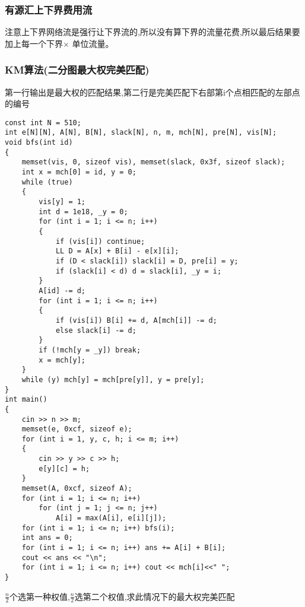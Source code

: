 \documentclass[a4paper, fontset=none]{ctexart}
\begin{document}
\subsubsection{有源汇上下界费用流}

注意上下界网络流是强行让下界流的,所以没有算下界的流量花费,所以最后结果要加上每一个下界$\times$ 单位流量。
\subsubsection{KM算法(二分图最大权完美匹配)}

第一行输出是最大权的匹配结果,第二行是完美匹配下右部第i个点相匹配的左部点的编号

\begin{verbatim}
const int N = 510;
int e[N][N], A[N], B[N], slack[N], n, m, mch[N], pre[N], vis[N];
void bfs(int id)
{
    memset(vis, 0, sizeof vis), memset(slack, 0x3f, sizeof slack);
    int x = mch[0] = id, y = 0;
    while (true)
    {
        vis[y] = 1;
        int d = 1e18, _y = 0;
        for (int i = 1; i <= n; i++)
        {
            if (vis[i]) continue;
            LL D = A[x] + B[i] - e[x][i];
            if (D < slack[i]) slack[i] = D, pre[i] = y;
            if (slack[i] < d) d = slack[i], _y = i;
        }
        A[id] -= d;
        for (int i = 1; i <= n; i++)
        {
            if (vis[i]) B[i] += d, A[mch[i]] -= d;
            else slack[i] -= d;
        }
        if (!mch[y = _y]) break;
        x = mch[y];
    }
    while (y) mch[y] = mch[pre[y]], y = pre[y];
}
int main()
{
    cin >> n >> m;
    memset(e, 0xcf, sizeof e);
    for (int i = 1, y, c, h; i <= m; i++)
    {
        cin >> y >> c >> h;
        e[y][c] = h;
    }
    memset(A, 0xcf, sizeof A);
    for (int i = 1; i <= n; i++)
        for (int j = 1; j <= n; j++)
            A[i] = max(A[i], e[i][j]);
    for (int i = 1; i <= n; i++) bfs(i);
    int ans = 0;
    for (int i = 1; i <= n; i++) ans += A[i] + B[i];
    cout << ans << "\n";
    for (int i = 1; i <= n; i++) cout << mch[i]<<" ";
}
\end{verbatim}

$\frac{n}{2}$个选第一种权值,$\frac{n}{2}$选第二个权值,求此情况下的最大权完美匹配
\end{document}
